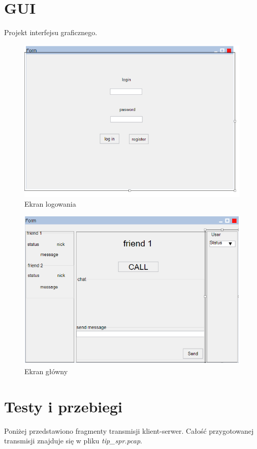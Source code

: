 \documentclass[12pt,a4paper]{article}
\begin{document}
	\pagebreak
	\section{GUI}
	\par Projekt interfejsu graficznego. 
	
	\begin{figure}[h!]
		\begin{center}
			\includegraphics*[width=.7\textwidth]{login_screen.png}
		\end{center}
		\caption{Ekran logowania}
	\end{figure}
	
	\begin{figure}[h!]
		\begin{center}
			\includegraphics*[width=.7\textwidth]{main_screen.png}
		\end{center}
		\caption{Ekran główny}
	\end{figure}
	
	\pagebreak
	\section{Testy i przebiegi}
	\par Poniżej przedstawiono fragmenty transmisji klient-serwer. Całość przygotowanej transmisji znajduje się w pliku
	\textit{tip\_spr.pcap}. 
	
\end{document}
